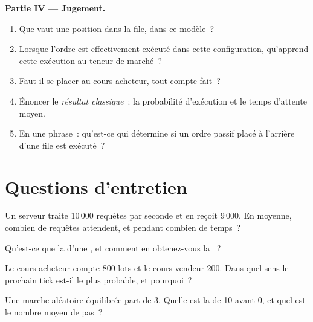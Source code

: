 \begin{problem}
\medskip\noindent\textbf{Partie IV --- Jugement.}
\begin{enumerate}[resume]
\item Que vaut une position dans la file, dans ce modèle~?
\item Lorsque l'ordre est effectivement exécuté dans cette configuration, qu'apprend cette exécution au teneur de marché~?
\item Faut-il se placer au cours acheteur, tout compte fait~?
\item Énoncer le \emph{résultat classique}~: la probabilité d'exécution et le temps d'attente moyen.
\item En une phrase~: qu'est-ce qui détermine si un ordre passif placé à l'arrière d'une file est exécuté~?
\end{enumerate}
\end{problem}

\section{Questions d'entretien}

\begin{interviewq}\label{iq:qm:markov-chains-and-queues:1}
Un serveur traite 10\,000 requêtes par seconde et en reçoit 9\,000. En moyenne, combien de requêtes attendent, et pendant combien de temps~?
\end{interviewq}

\begin{interviewq}\label{iq:qm:markov-chains-and-queues:2}
Qu'est-ce que la  d'une , et comment en obtenez-vous la ~?
\end{interviewq}

\begin{interviewq}\label{iq:qm:markov-chains-and-queues:3}
Le cours acheteur compte 800 lots et le cours vendeur 200. Dans quel sens le prochain tick est-il le plus probable, et pourquoi~?
\end{interviewq}

\begin{interviewq}\label{iq:qm:markov-chains-and-queues:4}
Une marche aléatoire équilibrée part de 3. Quelle est la  de 10 avant 0, et quel est le nombre moyen de pas~?
\end{interviewq}

